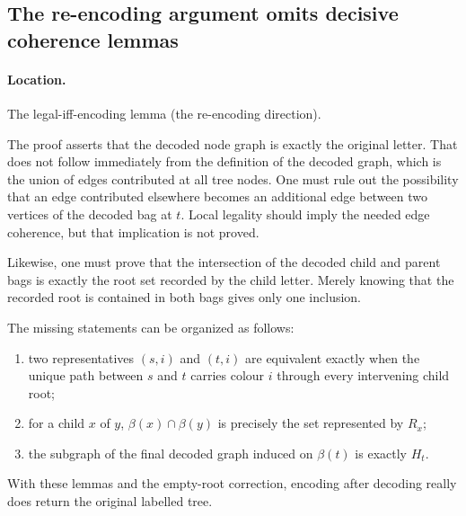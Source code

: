 \documentclass[11pt]{article}
\begin{document}
\subsection{The re-encoding argument omits decisive coherence lemmas}

\paragraph{Location.} The legal-iff-encoding lemma (the re-encoding direction).

The proof asserts that the decoded node graph is exactly the original letter.
That does not follow immediately from the definition of the decoded graph,
which is the union of edges contributed at all tree nodes.  One must rule out
the possibility that an edge contributed elsewhere becomes an additional edge
between two vertices of the decoded bag at \(t\).  Local legality should imply
the needed edge coherence, but that implication is not proved.

Likewise, one must prove that the intersection of the decoded child and parent
bags is exactly the root set recorded by the child letter.  Merely knowing that
the recorded root is contained in both bags gives only one inclusion.

The missing statements can be organized as follows:
\begin{enumerate}[label=(\alph*),leftmargin=*]
  \item two representatives \((s,i)\) and \((t,i)\) are equivalent exactly when
    the unique path between \(s\) and \(t\) carries colour \(i\) through every
    intervening child root;
  \item for a child \(x\) of \(y\),
    \(\beta(x)\cap\beta(y)\) is precisely the set represented by \(R_x\);
  \item the subgraph of the final decoded graph induced on \(\beta(t)\) is
    exactly \(H_t\).
\end{enumerate}
With these lemmas and the empty-root correction, encoding after decoding really
does return the original labelled tree.
\end{document}
